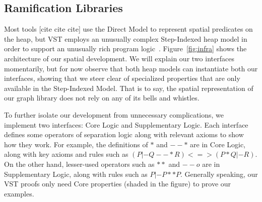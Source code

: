 \subsection{Ramification Libraries}\label{sec:ramifylib}




Most tools {\color{red}[cite cite cite]} use the Direct Model to 
represent spatial predicates
on the heap, but VST employs an unusually complex Step-Indexed heap model 
in order to support an unusually rich program
logic~\cite{appel:programlogics}.
Figure~\ref{fig:infra} shows the architecture of our spatial development.
We will explain our two interfaces momentarily, but for now observe that 
both heap models can instantiate both our interfaces, showing
that we steer clear of specialized properties that are only 
available in the Step-Indexed Model. That is to say, the spatial representation
of our graph library does not rely on any of its bells and whistles.

To further isolate our development from unnecessary complications,
we implement two interfaces: Core Logic and Supplementary Logic.
Each interface defines some operators of separation logic 
along with relevant axioms to show how they work.  
For example, the definitions of $*$ and
$--*$ are in Core Logic, along with key axioms and rules such as
$(P |- Q --* R) <=> (P * Q |- R)$.  
On the other hand, lesser-used operators such as 
$**$ and $--o$ are in Supplementary Logic,
along with rules such as $P |- P ** P$. 
Generally speaking, our VST proofs only need Core properties 
(shaded in the figure) to prove our examples.



